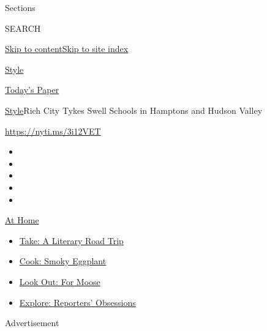 Sections

SEARCH

\protect\hyperlink{site-content}{Skip to
content}\protect\hyperlink{site-index}{Skip to site index}

\href{https://www.nytimes.com/section/style}{Style}

\href{https://myaccount.nytimes.com/auth/login?response_type=cookie\&client_id=vi}{}

\href{https://www.nytimes.com/section/todayspaper}{Today's Paper}

\href{/section/style}{Style}\textbar{}Rich City Tykes Swell Schools in
Hamptons and Hudson Valley

\url{https://nyti.ms/3i12VET}

\begin{itemize}
\item
\item
\item
\item
\item
\end{itemize}

\href{https://www.nytimes.com/spotlight/at-home?action=click\&pgtype=Article\&state=default\&region=TOP_BANNER\&context=at_home_menu}{At
Home}

\begin{itemize}
\tightlist
\item
  \href{https://www.nytimes.com/2020/07/28/books/time-for-a-literary-road-trip.html?action=click\&pgtype=Article\&state=default\&region=TOP_BANNER\&context=at_home_menu}{Take:
  A Literary Road Trip}
\item
  \href{https://www.nytimes.com/2020/07/29/magazine/bored-with-your-home-cooking-some-smoky-eggplant-will-fix-that.html?action=click\&pgtype=Article\&state=default\&region=TOP_BANNER\&context=at_home_menu}{Cook:
  Smoky Eggplant}
\item
  \href{https://www.nytimes.com/2020/07/27/travel/moose-michigan-isle-royale.html?action=click\&pgtype=Article\&state=default\&region=TOP_BANNER\&context=at_home_menu}{Look
  Out: For Moose}
\item
  \href{https://www.nytimes.com/interactive/2020/at-home/even-more-reporters-editors-diaries-lists-recommendations.html?action=click\&pgtype=Article\&state=default\&region=TOP_BANNER\&context=at_home_menu}{Explore:
  Reporters' Obsessions}
\end{itemize}

Advertisement

